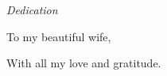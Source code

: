 \begin{dedication}
    \thispagestyle{empty}
    \vspace*{\fill}
    \begin{center}
        \Large\textit{Dedication}
        \vspace{1cm}
        
        To my beautiful wife,
        
        
        With all my love and gratitude.
    \end{center}
    \vspace*{\fill}
    \end{dedication}